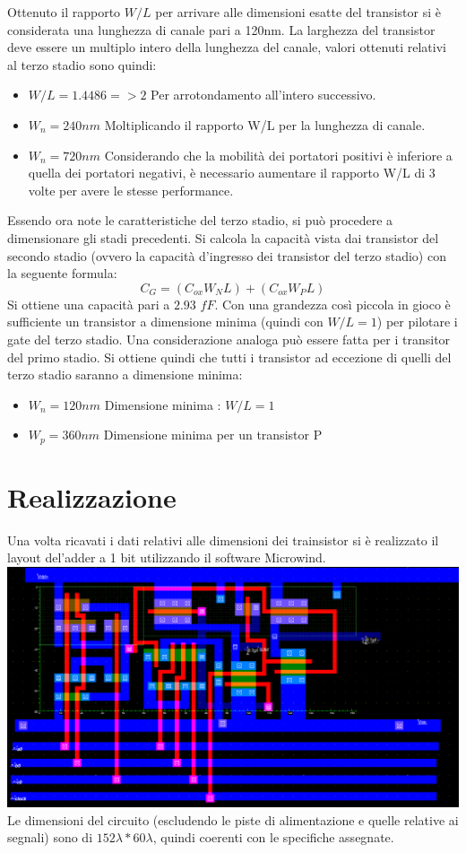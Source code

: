 \documentclass[12pt]{article} %
\begin{document}
Ottenuto il rapporto $W/L$ per arrivare alle dimensioni esatte del transistor si è considerata una lunghezza di canale pari a 120nm. La larghezza del transistor deve essere un multiplo intero della lunghezza del canale, valori ottenuti relativi al terzo stadio sono quindi:

\begin{itemize}
\item $W/L = 1.4486 => 2$  Per arrotondamento all'intero successivo.
\item $W_{n} = 240 nm$ Moltiplicando il rapporto W/L per la lunghezza di canale.
\item $W_{n} = 720 nm$ Considerando che la mobilità dei portatori positivi è inferiore a quella dei portatori negativi, è necessario aumentare il rapporto W/L di 3 volte per avere le stesse performance.
\end{itemize}

Essendo ora note le caratteristiche del terzo stadio, si può procedere a dimensionare gli stadi precedenti.
Si calcola la capacità vista dai transistor del secondo stadio (ovvero la capacità d'ingresso dei transistor del terzo stadio) con la seguente formula:
\begin{equation} 
C_{G}= (C_{ox}W_{N}L) + (C_{ox}W_{P}L)
\end{equation}
Si ottiene una capacità pari a $2.93$ $fF$. Con una grandezza così piccola in gioco è sufficiente un transistor a dimensione minima (quindi con $W/L =1$) per pilotare i gate del terzo stadio.
Una considerazione analoga può essere fatta per i transitor del primo stadio. Si ottiene quindi che tutti i transistor ad eccezione di quelli del terzo stadio saranno a dimensione minima:

\begin{itemize}
\item $W_{n} = 120 nm$ Dimensione minima :  $W/L = 1$
\item $W_{p} = 360 nm$ Dimensione minima per un transistor P
\end{itemize}

\section{Realizzazione}
Una volta ricavati i dati relativi alle dimensioni dei trainsistor si è realizzato il layout del'adder a 1 bit utilizzando il software Microwind.\\
\includegraphics[scale=0.4]{Layout1_152x60}
Le dimensioni del circuito (escludendo le piste di alimentazione e quelle relative ai segnali) sono di $152 \lambda * 60 \lambda$, quindi coerenti con le specifiche assegnate.
\end{document}
